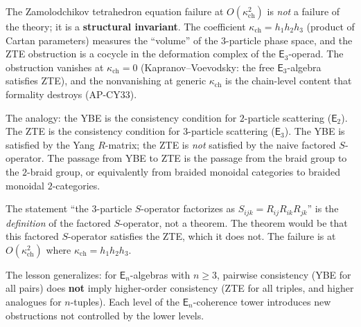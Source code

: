 \documentclass[11pt]{article}
\begin{document}
\begin{observation}
\label{obs:zte-nonpert}
The Zamolodchikov tetrahedron equation failure at $O(\kappa_{\mathrm{ch}}^2)$ is
\emph{not} a failure of the theory; it is a \textbf{structural
invariant}. The coefficient $\kappa_{\mathrm{ch}} = h_1 h_2 h_3$ (product of
Cartan parameters) measures the ``volume'' of the $3$-particle
phase space, and the ZTE obstruction is a cocycle in the deformation
complex of the $\mathsf{E}_3$-operad. The obstruction vanishes at
$\kappa_{\mathrm{ch}} = 0$ (Kapranov--Voevodsky: the free $\mathsf{E}_3$-algebra
satisfies ZTE), and the nonvanishing at generic $\kappa_{\mathrm{ch}}$ is the
chain-level content that formality destroys (AP-CY33).

The analogy: the YBE is the consistency condition for $2$-particle
scattering ($\mathsf{E}_2$). The ZTE is the consistency condition for
$3$-particle scattering ($\mathsf{E}_3$). The YBE is satisfied by the
Yang $R$-matrix; the ZTE is \emph{not} satisfied by the naive
factored $S$-operator. The passage from YBE to ZTE is the passage
from the braid group to the $2$-braid group, or equivalently from
braided monoidal categories to braided monoidal $2$-categories.
\end{observation}

\begin{observation}
\label{obs:factored-not-solved}
The statement ``the $3$-particle $S$-operator factorizes as
$S_{ijk} = R_{ij} R_{ik} R_{jk}$'' is the \emph{definition} of
the factored $S$-operator, not a theorem. The theorem would be that
this factored $S$-operator satisfies the ZTE, which it does not.
The failure is at $O(\kappa_{\mathrm{ch}}^2)$ where $\kappa_{\mathrm{ch}} = h_1 h_2 h_3$.

The lesson generalizes: for $\mathsf{E}_n$-algebras with $n \geq 3$,
pairwise consistency (YBE for all pairs) does \textbf{not} imply
higher-order consistency (ZTE for all triples, and higher analogues
for $n$-tuples). Each level of the $\mathsf{E}_n$-coherence tower
introduces new obstructions not controlled by the lower levels.
\end{observation}
\end{document}
